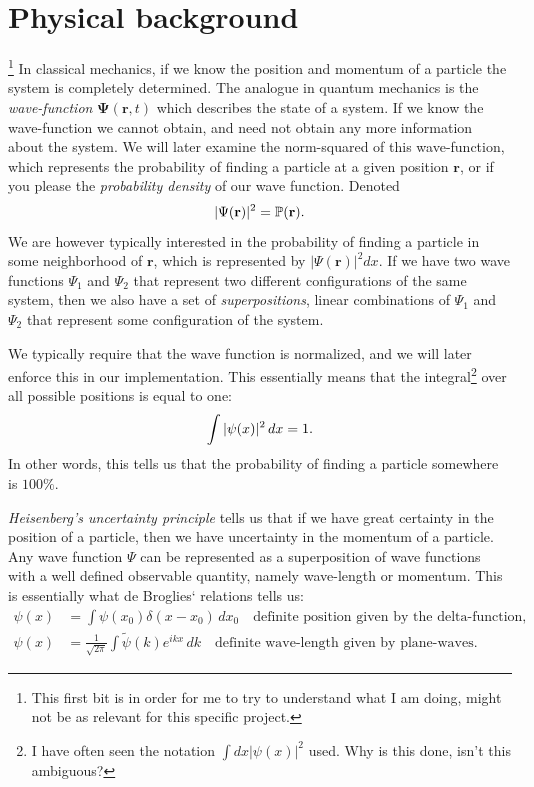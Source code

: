 \documentclass[a4paper, 10pt]{amsart}
\renewcommand{\v}[1]{\mathbf{#1}}
\begin{document}
\section{Physical background}\footnote{This first bit is in order for me to try
to understand what I am doing, might not be as relevant for this specific
project.}
\label{sec:physical_background}
In classical mechanics, if we know the position and momentum of a particle the
system is completely determined. The analogue in quantum mechanics is the
\emph{wave-function} \( \mathbf{\Psi}(\mathbf{r}, t)\) which describes the
state of a system. If we know the wave-function we cannot obtain, and need not
obtain any more information about the system. We will later examine the
norm-squared of this wave-function, which represents the probability of finding
a particle at a given position $\v{r}$, or if you please the \emph{probability
density} of our wave function.  Denoted
\begin{equation}
  \notag
  |\Psi(\v{r})|^2 = \mathbb{P}(\v{r}).
\end{equation}
We are however typically interested in the probability of finding a particle in
some neighborhood of $\v{r}$, which is represented by $|\Psi(\v{r})|^2 dx$.  If
we have two wave functions $\Psi_1$ and $\Psi_2$ that represent two different
configurations of the same system, then we also have a set of
\textit{superpositions}, linear combinations of $\Psi_1$ and $\Psi_2$ that
represent some configuration of the system.

We typically require that the wave function is normalized, and we will later
enforce this in our implementation. This essentially means that the
integral\footnote{I have often seen the notation $\int dx |\psi(x)|^2$ used.
Why is this done, isn't this ambiguous?} over all possible positions is equal
to one:
\begin{equation}
  \notag
  \int |\psi(x)|^2 \, dx = 1.
\end{equation}
In other words, this tells us that the probability of finding a particle
somewhere is $100\%$.

\emph{Heisenberg's uncertainty principle} tells us that if we have great
certainty in the position of a particle, then we have uncertainty in the
momentum of a particle.  Any wave function $\Psi$ can be represented as a
superposition of wave functions with a well defined observable quantity, namely
wave-length or momentum. This is essentially what de Broglies` relations tells
us:
\begin{align*}
  \psi(x) &= \int \psi(x_0) \delta(x - x_0) \, dx_0 \quad \text{definite position given by the delta-function, }\\
  \psi(x) &= \frac{1}{\sqrt{2\pi}}\int \tilde{\psi}(k) e^{ikx} \, dk \quad \text{definite wave-length given by plane-waves}.
\end{align*}
\end{document}
